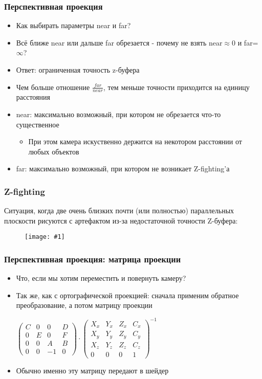 \documentclass{beamer}
\newcommand{\slideimage}[1]{
  \begin{figure}
    \begin{adjustbox}{width=\textwidth, totalheight=\textheight-2\baselineskip-2\baselineskip,keepaspectratio}
      \texttt{[image: \#1]}
    \end{adjustbox}
  \end{figure}
}
\begin{document}
\begin{frame}[fragile]
\frametitle{Перспективная проекция}
\begin{itemize}
\item Как выбирать параметры near и far?
\pause
\item Всё ближе near или дальше far обрезается - почему не взять near\begin{math}\approx 0\end{math} и far=\begin{math}\infty\end{math}?
\pause
\item Ответ: ограниченная точность z-буфера
\item Чем больше отношение \begin{math}\frac{far}{near}\end{math}, тем меньше точности приходится на единицу расстояния
\pause
\item near: максимально возможный, при котором не обрезается что-то существенное
\begin{itemize}
\item При этом камера искуственно держится на некотором расстоянии от любых объектов
\end{itemize}
\pause
\item far: максимально возможный, при котором не возникает Z-fighting'а
\end{itemize}
\end{frame}

\begin{frame}[fragile]
\frametitle{Z-fighting}
Ситуация, когда две очень близких почти (или полностью) параллельных плоскости рисуются с артефактом из-за недостаточной точности Z-буфера:
\slideimage{z-fighting.png}
\end{frame}

\begin{frame}[fragile]
\frametitle{Перспективная проекция: матрица проекции}
\begin{itemize}
\item Что, если мы хотим переместить и повернуть камеру?
\pause
\item Так же, как с ортографической проекцией: сначала применим обратное преобразование, а потом матрицу проекции
\pause
\begin{center}
\begin{math}
\begin{pmatrix}
C & 0 & 0 & D \\
0 & E & 0 & F \\
0 & 0 & A & B \\
0 & 0 & -1 & 0
\end{pmatrix}
\cdot
\begin{pmatrix}
X_x & Y_x & Z_x & C_x \\
X_y & Y_y & Z_y & C_y \\
X_z & Y_z & Z_z & C_z \\
0 & 0 & 0 & 1
\end{pmatrix}^{-1}
\end{math}
\end{center}
\pause
\item Обычно именно эту матрицу передают в шейдер
\end{itemize}
\end{frame}
\end{document}
